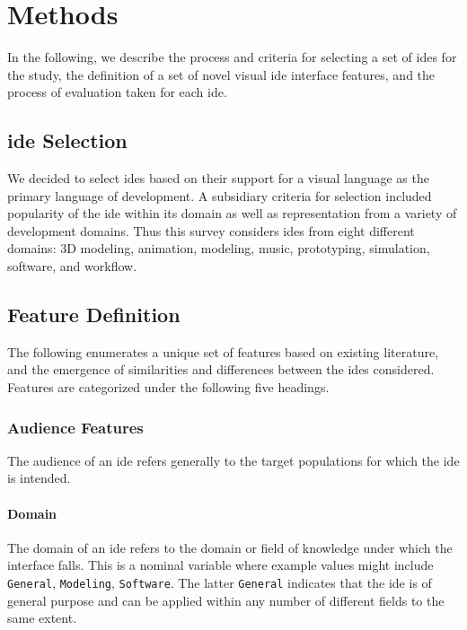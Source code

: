 \section{Methods} \label{sec:methods}

In the following, we describe the process and criteria for selecting a set of \acp{ide} for the study, the definition of a set of novel visual \ac{ide} interface features, and the process of evaluation taken for each \ac{ide}.


\subsection{\acs{ide} Selection} \label{subsec:ideselection}

We decided to select \acp{ide} based on their support for a visual language as the primary language of development.
A subsidiary criteria for selection included popularity of the \ac{ide} within its domain as well as representation from a variety of development domains.
Thus this survey considers \acp{ide} from eight different domains: 3D modeling, animation, modeling, music, prototyping, simulation, software, and workflow.


\subsection{Feature Definition} \label{subsec:featuredefinition}

The following enumerates a unique set of features based on existing literature, and the emergence of similarities and differences between the \acp{ide} considered.
Features are categorized under the following five headings.


\subsubsection{Audience Features} \label{subsubsec:audience}

The audience of an \ac{ide} refers generally to the target populations for which
the \ac{ide} is intended.


\paragraph{Domain}
The domain of an \ac{ide} refers to the domain or field of
knowledge under which the interface falls.
This is a nominal variable where example values might include \texttt{General}, \texttt{Modeling}, \texttt{Software}.
The latter \texttt{General} indicates that the \ac{ide} is of general purpose and can be applied within any number of different fields to the same extent.


